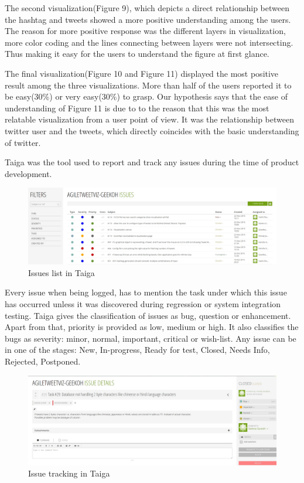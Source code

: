\documentclass[11pt]{article}
\begin{document}
The second visualization(Figure 9), which depicts a direct relationship between the hashtag and tweets showed a more positive understanding among the users. The reason for more positive response was the different layers in visualization, more color coding and the lines connecting between layers were not intersecting. Thus making it easy for the users to understand the figure at first glance.
 
The final visualization(Figure 10 and Figure 11) displayed the most positive result among the three visualizations. More than half of the users reported it to be easy(30\%) or very easy(30\%) to grasp. Our hypothesis says that the ease of understanding of Figure 11 is due to to the reason that this was the most relatable visualization from a user point of view. It was the relationship between twitter user and the tweets, which directly coincides with the basic understanding of twitter. 


Taiga\cite{TaigaSite} was the tool used to report and track any issues during the time of product development.

\begin{figure}[h]
\centering
\includegraphics[width=\textwidth]{Issues.jpg}
\caption{Issues list in Taiga\cite{TaigaSite}}
\end{figure}

Every issue when being logged, has to mention the task under which this issue has occurred unless it was discovered during regression or system integration testing. Taiga gives the classification of issues as bug, question or enhancement. Apart from that, priority is provided as low, medium or high. It also classifies the bugs as severity:  minor, normal, important, critical or wish-list. Any issue can be in one of the stages: New, In-progress, Ready for test, Closed, Needs Info, Rejected, Postponed. 

\begin{figure}[h]
\centering
\includegraphics[width=\textwidth]{Issue2.jpg}
\caption{Issue tracking in Taiga\cite{TaigaSite}}
\end{figure}
\end{document}
